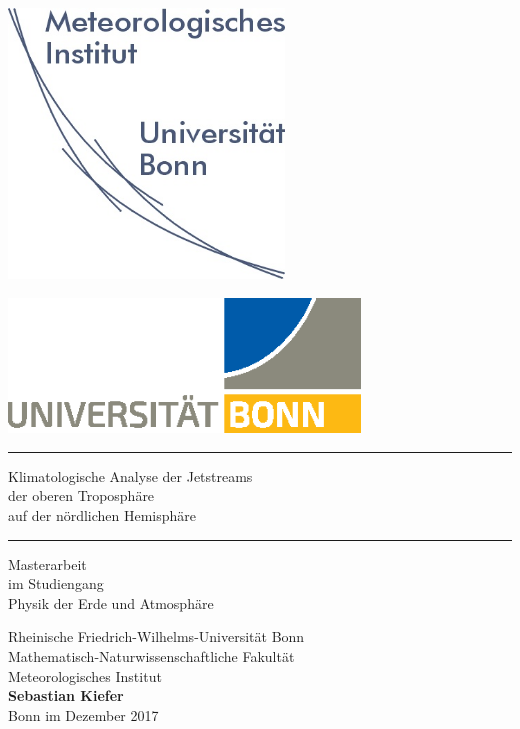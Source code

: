 \begin{titlingpage}

\begin{center}%
\begin{minipage}{0.45\textwidth} %
  \begin{center}
  \includegraphics[width=0.55\textwidth]{01-logo/c-logo_miub} \\
  \end{center}
\end{minipage} 
\hfill %
\begin{minipage}{0.45\textwidth} %
  \begin{center}
  \includegraphics[width=0.7\textwidth]{01-logo/c-logo_uni_2017} \\
  \end{center}
\end{minipage}

\vspace{1cm} \hrule \vspace{1cm}

\begin{LARGE}
  Klimatologische Analyse der Jetstreams \\
  der oberen Troposphäre \\
  auf der nördlichen Hemisphäre \\
\end{LARGE}
\vspace{1cm} \hrule \vfill

\normalsize 
Masterarbeit\\im Studiengang\\
Physik der Erde und Atmosphäre
     
\vfill
Rheinische Friedrich-Wilhelms-Universität Bonn\\
Mathematisch-Naturwissenschaftliche Fakultät\\
Meteorologisches Institut\\

\vfill
\textbf{Sebastian Kiefer} \\ %
Bonn im Dezember 2017
\end{center}
\end{titlingpage}
